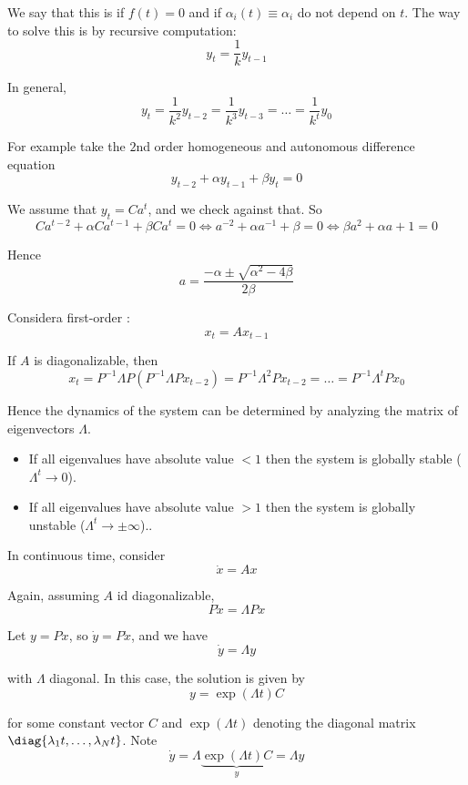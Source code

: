 \documentclass{article}
\begin{document}
We say that this is  if $f(t) = 0$ and  if $\alpha_i(t) \equiv \alpha_i$ do not depend on $t$. The way to solve this is by recursive computation:
\[
  y_t = \dfrac{1}{k} y_{t - 1}
\]

In general,
\[
  y_t
  = \dfrac{1}{k^2} y_{t - 2}
  = \dfrac{1}{k^3} y_{t - 3}
  = \ldots
  = \dfrac{1}{k^t} y_{0}
\]

For example take the $2$nd order homogeneous and autonomous difference equation
\[
  y_{t - 2} + \alpha y_{t - 1} + \beta y_{t} = 0
\]

We assume that $y_t = Ca^t$, and we check against that. So
\[
  Ca^{t - 2}
  + \alpha Ca^{t - 1}
  + \beta Ca^{t}
  = 0
  \iff
  a^{-2}
  + \alpha a^{-1}
  + \beta
  = 0
  \iff
  \beta a^2 + \alpha a + 1 = 0
\]

Hence
\[
  a = \dfrac{-\alpha \pm \sqrt{\alpha^2 - 4\beta}}{2\beta}
\]

Considera first-order :
\[
  x_t = A x_{t - 1}
\]

If $A$ is diagonalizable, then
\[
  x_t
  = P^{-1} \Lambda P \left(P^{-1} \Lambda P x_{t - 2}\right)
  = P^{-1} \Lambda^2 P x_{t - 2}
  = \ldots
  = P^{-1} \Lambda^t P x_{0}
\]

Hence the dynamics of the system can be determined by analyzing the matrix of eigenvectors $\Lambda$.
\begin{itemize}[label=$\bullet$]
  \item If all eigenvalues have absolute value $< 1$ then the system is globally stable ($\Lambda^t \to 0$).

  \item If all eigenvalues have absolute value $> 1$ then the system is globally unstable ($\Lambda^t \to \pm \infty$)..
\end{itemize}

In continuous time, consider
\[
  \dot{x} = A x
\]

Again, assuming $A$ id diagonalizable,
\[
  P \dot{x} = \Lambda P x
\]

Let $y = P x$, so $\dot{y} = P \dot{x}$, and we have
\[
  \dot{y} = \Lambda y
\]

with $\Lambda$ diagonal. In this case, the solution is given by
\[
  y = \exp(\Lambda t) C
\]

for some constant vector $C$ and $\exp(\Lambda t)$ denoting the diagonal matrix $\diag{\lambda_1 t, \ldots, \lambda_N t}$. Note
\[
  \dot{y}
  =
  \Lambda
  \underbrace{\exp(\Lambda t) C}_y
  =
  \Lambda y
\]
\end{document}
